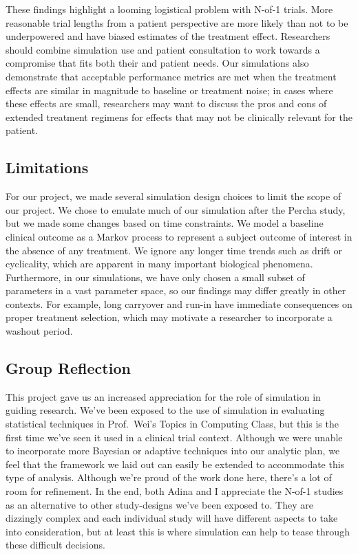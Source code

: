 \documentclass[11pt,]{article}
\begin{document}
These findings highlight a looming logistical problem with N-of-1
trials. More reasonable trial lengths from a patient perspective are
more likely than not to be underpowered and have biased estimates of the
treatment effect. Researchers should combine simulation use and patient
consultation to work towards a compromise that fits both their and
patient needs. Our simulations also demonstrate that acceptable
performance metrics are met when the treatment effects are similar in
magnitude to baseline or treatment noise; in cases where these effects
are small, researchers may want to discuss the pros and cons of extended
treatment regimens for effects that may not be clinically relevant for
the patient.

\subsection{Limitations}\label{limitations}

For our project, we made several simulation design choices to limit the
scope of our project. We chose to emulate much of our simulation after
the Percha study, but we made some changes based on time constraints. We
model a baseline clinical outcome as a Markov process to represent a
subject outcome of interest in the absence of any treatment. We ignore
any longer time trends such as drift or cyclicality, which are apparent
in many important biological phenomena. Furthermore, in our simulations,
we have only chosen a small subset of parameters in a vast parameter
space, so our findings may differ greatly in other contexts. For
example, long carryover and run-in have immediate consequences on proper
treatment selection, which may motivate a researcher to incorporate a
washout period.

\subsection{Group Reflection}\label{group-reflection}

This project gave us an increased appreciation for the role of
simulation in guiding research. We've been exposed to the use of
simulation in evaluating statistical techniques in Prof.~Wei's Topics in
Computing Class, but this is the first time we've seen it used in a
clinical trial context. Although we were unable to incorporate more
Bayesian or adaptive techniques into our analytic plan, we feel that the
framework we laid out can easily be extended to accommodate this type of
analysis. Although we're proud of the work done here, there's a lot of
room for refinement. In the end, both Adina and I appreciate the N-of-1
studies as an alternative to other study-designs we've been exposed to.
They are dizzingly complex and each individual study will have different
aspects to take into consideration, but at least this is where
simulation can help to tease through these difficult decisions.
\end{document}
